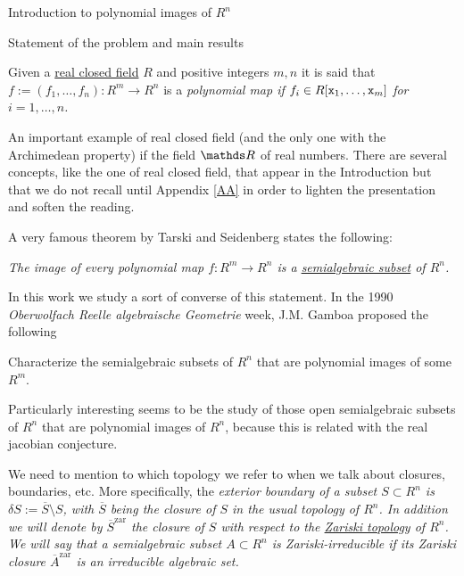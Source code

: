 \documentclass[11pt, a4paper, english, twoside, notitlepage, openright]{report}
\begin{document}
\tableofcontents
\thispagestyle{empty}

\listoffigures
\thispagestyle{empty}

\listoftables
\thispagestyle{empty}

\begin{chapter}{Introduction to polynomial images of $R^n$}

\begin{section}{Statement of the problem and main results}
\begin{definition}\label{polyMap} Given a \hyperref[realCField]{real closed field} $R$ and positive integers $m,n$ it is said that $f:=(f_1,\dots,f_n):R^m\to R^n$ is a \em polynomial map \em if $f_i\in R[{\tt x}_1,\dots,{\tt x}_m]$ for $i=1,\dots,n$. 
\end{definition}

An important example of real closed field (and the only one with the Archimedean property) if the field $\R$ of real numbers. There are several concepts, like the one of real closed field, that appear in the Introduction but that we do not recall until Appendix \ref{AA} in order to lighten the presentation and soften the reading.
	
A very famous theorem by Tarski and Seidenberg states the following:
\begin{theorem}\label{tarskiSeidenberg} \em The image of every polynomial map $f: R^m \longrightarrow R^n$ is a \hyperref[semialgSet]{semialgebraic subset} of $R^n$. \em
\end{theorem}

In this work we study a sort of converse of this statement. In the 1990 \emph{Oberwolfach Reelle algebraische Geometrie} week, J.M. Gamboa \cite{g} proposed the following
\begin{problem}
Characterize the semialgebraic subsets of $R^n$ that are polynomial images of some $R^m$.
\end{problem}
Particularly interesting seems to be the study of those open semialgebraic subsets of $R^n$ that are polynomial images of $R^n$, because this is related with the real jacobian conjecture.
	
\begin{notation} We need to mention to which topology we refer to when we talk about closures, boundaries, etc. More specifically, the \em exterior boundary \em of a subset $S\subset R^n$ is $\delta S:=\overline{S}\setminus S$, with $\overline{S}$ being the \em closure \em of $S$ in the usual topology of $R^n$. In addition we will denote by $\overline{S}^{\text{zar}}$ the closure of $S$ with respect to the \hyperref[zariski]{Zariski topology} of $R^n$. We will say that a semialgebraic subset $A\subset R^n$ is \em Zariski-irreducible \em if its Zariski closure $\overline{A}^{\text{zar}}$ is an irreducible algebraic set.
\end{notation}
	

\end{section}
\end{chapter}
\end{document}
